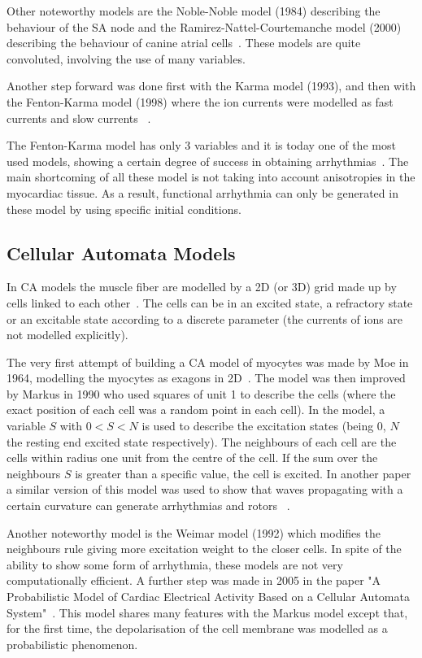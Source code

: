\documentclass{article}
\begin{document}
Other noteworthy models are the Noble-Noble model (1984) describing the behaviour of the SA node and the Ramirez-Nattel-Courtemanche model (2000) describing the behaviour of canine  atrial cells~\cite{physmodel_review}. These models are quite convoluted, involving the use of many variables. 

Another step forward was done first with the Karma model (1993), and then with the Fenton-Karma model (1998) where the ion currents were modelled as fast currents and slow currents ~\cite{physmodel_review}.

The Fenton-Karma model has only 3 variables and it is today one of the most used models, showing a certain degree of success in obtaining arrhythmias~\cite{physmodel_fkkktcomparison}. The main shortcoming of all these model is not taking into account anisotropies in the myocardiac tissue. As a result, functional arrhythmia can only be generated in these model by using specific initial conditions. 
 
\subsection{ Cellular Automata Models }
 
In CA models the muscle fiber are modelled by a 2D (or 3D) grid made up by cells linked to each other~\cite{cellauto_weimar1992}. The cells can be in an excited state, a refractory state or an excitable state according to a discrete parameter (the currents of ions are not modelled explicitly).   

The very first attempt of building a CA model of myocytes was made by Moe in 1964, modelling the myocytes as exagons in 2D~\cite{cellauto_review}. The model was then improved by Markus in 1990 who used squares of unit 1 to describe the cells (where the exact position of each cell was a random point in each cell). In the model, a variable $S$ with $0<S<N$ is used to describe the excitation states (being $0$, $N$ the resting end excited state respectively). The neighbours of each cell are the cells within radius one unit from the centre of the cell. If the sum over the neighbours $S$ is greater than a specific value, the cell is excited.  In another paper a similar version of this model was used to show that waves propagating with a certain curvature can generate arrhythmias and rotors ~\cite{cellauto_curvature1990}. 

Another noteworthy model is the Weimar model (1992)\cite{cellauto_review} which modifies the neighbours rule giving more excitation weight to the closer cells. In spite of the ability to show some form of arrhythmia, these models are not very computationally efficient. 
A further step was made in 2005 in the paper "A Probabilistic Model of Cardiac Electrical Activity Based on a Cellular Automata System"~\cite{cellauto_model2005}. This model shares many features with the Markus model except that, for the first time, the depolarisation of the cell membrane was modelled as a probabilistic phenomenon. 
\end{document}
